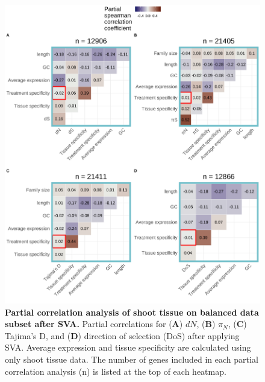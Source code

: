 \documentclass[12pt]{article}
\begin{document}
\begin{figure}[H]
\centering
\includegraphics[width = \linewidth]{figures/appendix_a/partialCorrelations_fullyBalancedSubset_shoot_2023-02-22.pdf}
\caption{\textbf{Partial correlation analysis of shoot tissue on balanced data subset after SVA.} Partial correlations for (\textbf{A}) $dN$, (\textbf{B}) $\pi_N$, (\textbf{C}) Tajima's D, and (\textbf{D}) direction of selection (DoS) after applying SVA. Average expression and tissue specificity are calculated using only shoot tissue data. The number of genes included in each partial correlation analysis (n) is listed at the top of each heatmap.}%
\end{figure}
\end{document}
